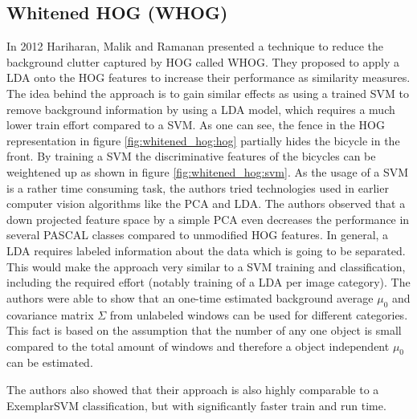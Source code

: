 \subsection{Whitened HOG (WHOG)}
\label{sec:whitened_hog}

In 2012 Hariharan, Malik and Ramanan presented a technique \cite{Hariharan2012} to reduce the background clutter captured by \ac{HOG} called \acf{WHOG}. They proposed to apply a \ac{LDA} onto the \ac{HOG} features to increase their performance as similarity measures. The idea behind the approach is to gain similar effects as using a trained \ac{SVM} to remove background information by using a \ac{LDA} model, which requires a much lower train effort compared to a \ac{SVM}. As one can see, the fence in the \ac{HOG} representation in figure \ref{fig:whitened_hog:hog} partially hides the bicycle in the front. By training a \ac{SVM} the discriminative features of the bicycles can be weightened up as shown in figure \ref{fig:whitened_hog:svm}. As the usage of a \ac{SVM} is a rather time consuming task, the authors tried technologies used in earlier computer vision algorithms like the \ac{PCA} \cite{jolliffe2002principal} and \ac{LDA}. The authors observed that a down projected feature space by a simple \ac{PCA} even decreases the performance in several PASCAL \cite{Pascal2007} classes compared to unmodified \ac{HOG} features. In general, a \ac{LDA} requires labeled information about the data which is going to be separated. This would make the approach very similar to a \ac{SVM} training and classification, including the required effort (notably training of a \ac{LDA} per image category). The authors were able to show that an one-time estimated background average $\mu_0$ and covariance matrix $\Sigma$ from unlabeled windows can be used for different categories. This fact is based on the assumption that the number of any one object is small compared to the total amount of windows and therefore a object independent $\mu_0$ can be estimated.

The authors also showed that their approach is also highly comparable to a ExemplarSVM classification, but with significantly faster train and run time. 

